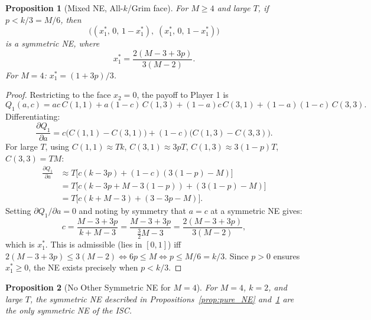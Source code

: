 \documentclass[12pt,a4paper]{article}
\newtheorem{proposition}{Proposition}[section]
\begin{document}
\begin{proposition}[Mixed NE, All-$k$/Grim face]\label{prop:mixed_13}
For $M\geq 4$ and large $T$, if $p < k/3 = M/6$, then
\[
  \bigl((x_1^*,\,0,\,1-x_1^*),\;(x_1^*,\,0,\,1-x_1^*)\bigr)
\]
is a symmetric NE, where
\begin{equation}\label{eq:x1star}
  x_1^* = \frac{2(M-3+3p)}{3(M-2)}.
\end{equation}
For $M=4$: $x_1^* = (1+3p)/3$.
\end{proposition}

\begin{proof}
Restricting to the face $x_2=0$, the payoff to Player 1 is
\[
  Q_1(a,c) = ac\,C(1,1)+a(1-c)\,C(1,3)+(1-a)c\,C(3,1)+(1-a)(1-c)\,C(3,3).
\]
Differentiating:
\[
  \frac{\partial Q_1}{\partial a}
  = c\bigl(C(1,1)-C(3,1)\bigr)+(1-c)\bigl(C(1,3)-C(3,3)\bigr).
\]
For large $T$, using $C(1,1)\approx Tk$, $C(3,1)\approx 3pT$,
$C(1,3)\approx 3(1-p)T$, $C(3,3)=TM$:
\begin{align*}
  \frac{\partial Q_1}{\partial a}
  &\approx T\bigl[c(k-3p)+(1-c)(3(1-p)-M)\bigr] \\
  &= T\bigl[c(k-3p+M-3(1-p))+(3(1-p)-M)\bigr] \\
  &= T\bigl[c(k+M-3)+(3-3p-M)\bigr].
\end{align*}
Setting $\partial Q_1/\partial a = 0$ and noting by symmetry that $a=c$ at a
symmetric NE gives:
\[
  c = \frac{M-3+3p}{k+M-3} = \frac{M-3+3p}{\tfrac{3}{2}M-3} = \frac{2(M-3+3p)}{3(M-2)},
\]
which is $x_1^*$. This is admissible (lies in $[0,1]$) iff
$2(M-3+3p)\leq 3(M-2)\Leftrightarrow 6p\leq M\Leftrightarrow p\leq M/6=k/3$.
Since $p>0$ ensures $x_1^*\geq 0$, the NE exists precisely when $p<k/3$.
\end{proof}

\begin{proposition}[No Other Symmetric NE for $M=4$]\label{prop:no_other_NE}
For $M=4$, $k=2$, and large $T$, the symmetric NE described in
Propositions~\ref{prop:pure_NE} and~\ref{prop:mixed_13} are the only symmetric NE of the ISC.
\end{proposition}
\end{document}
